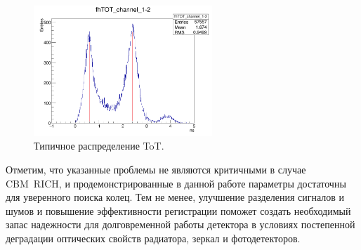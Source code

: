 \begin{figure}[H]
\includegraphics[width=0.6\textwidth]{pictures/29_Scope_vs_data-data.png}
\caption{Типичное распределение ToT.}
\label{fig:ToTdata}
\end{figure}

Отметим, что указанные проблемы не являются критичными в случае CBM~RICH, и продемонстрированные в данной работе параметры достаточны для уверенного поиска колец. Тем не менее, улучшение разделения сигналов и шумов и повышение эффективности регистрации поможет создать необходимый запас надежности для долговременной работы детектора в условиях постепенной деградации оптических свойств радиатора, зеркал и фотодетекторов.
